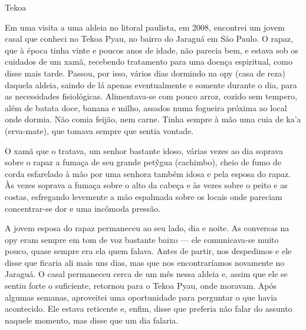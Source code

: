 Tekoa

Em uma visita a uma aldeia no litoral paulista, em 2008, encontrei um
jovem casal que conheci no Tekoa Pyau, no bairro do Jaraguá em São
Paulo. O rapaz, que à época tinha vinte e poucos anos de idade, não
parecia bem, e estava sob os cuidados de um xamã, recebendo tratamento
para uma doença espiritual, como disse mais tarde. Passou, por isso,
vários dias dormindo na opy (casa de reza) daquela aldeia, saindo de lá
apenas eventualmente e somente durante o dia, para as necessidades
fisiológicas. Alimentava-se com pouco arroz, cozido sem tempero, além
de batata doce, banana e milho, assados numa fogueira próxima ao local
onde dormia. Não comia feijão, nem carne. Tinha sempre à mão uma cuia
de ka’a (erva-mate), que tomava sempre que sentia vontade. 

O xamã que o tratava, um senhor bastante idoso, várias vezes ao dia
soprava sobre o rapaz a fumaça de seu grande pet\~{y}gua (cachimbo),
cheio de fumo de corda esfarelado à mão por uma senhora também idosa e
pela esposa do rapaz. Às vezes soprava a fumaça sobre o alto da cabeça
e às vezes sobre o peito e as costas, esfregando levemente a mão
espalmada sobre os locais onde pareciam concentrar-se dor e uma
incômoda pressão.

A jovem esposa do rapaz permaneceu ao seu lado, dia e noite. As
conversas na opy eram sempre em tom de voz bastante baixo — ele
comunicava-se muito pouco, quase sempre era ela quem falava. Antes de
partir, nos despedimos e ele disse que ficaria ali mais uns dias, mas
que nos encontraríamos novamente no Jaraguá. O casal permaneceu cerca
de um mês nessa aldeia e, assim que ele se sentiu forte o suficiente,
retornou para o Tekoa Pyau, onde moravam. Após algumas semanas,
aproveitei uma oportunidade para perguntar o que havia acontecido. Ele
estava reticente e, enfim, disse que preferia não falar do assunto
naquele momento, mas disse que um dia falaria.

